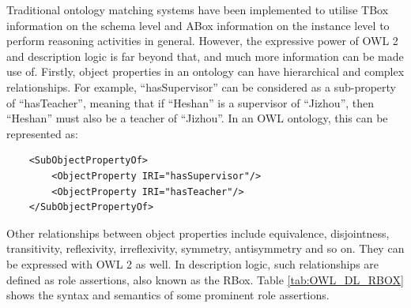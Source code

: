 Traditional ontology matching systems have been implemented to utilise TBox information on the schema level and ABox information on the instance level to perform reasoning activities in general. However, the expressive power of OWL 2 and description logic is far beyond that, and much more information can be made use of. Firstly, object properties in an ontology can have hierarchical and complex relationships. For example, ``hasSupervisor'' can be considered as a sub-property of ``hasTeacher'', meaning that if ``Heshan'' is a supervisor of ``Jizhou'', then ``Heshan'' must also be a teacher of ``Jizhou''. In an OWL ontology, this can be represented as:

\lstset{language=Java}
\begin{lstlisting}
    <SubObjectPropertyOf>
        <ObjectProperty IRI="hasSupervisor"/>
        <ObjectProperty IRI="hasTeacher"/>
    </SubObjectPropertyOf>
\end{lstlisting}

Other relationships between object properties include equivalence, disjointness, transitivity, reflexivity, irreflexivity, symmetry, antisymmetry and so on. They can be expressed with OWL 2 as well. In description logic, such relationships are defined as role assertions, also known as the RBox. Table \ref{tab:OWL_DL_RBOX} shows the syntax and semantics of some prominent role assertions.
\\

\begin{table}[h]
\centering
{}
\caption{RBox Assertions}
\label{tab:OWL_DL_RBOX}
\end{table}

